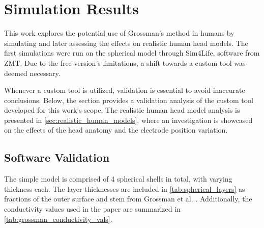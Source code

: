 \pagebreak
\chapter{Simulation Results}



This work explores the potential use of Grossman's \cite{Grossman2017} method in humans by simulating and later assessing the effects on realistic human head models. The first simulations were run on the spherical model through Sim4Life, software from \gls{ZMT}. Due to the free version's limitations, a shift towards a custom tool was deemed necessary.

Whenever a custom tool is utilized, validation is essential to avoid inaccurate conclusions. Below, the  section provides a validation analysis of the custom tool developed for this work's scope. The realistic human head model analysis is presented in \autoref{sec:realistic_human_models}, where an investigation is showcased on the effects of the head anatomy and the electrode position variation.

\section{Software Validation}
\label{sec:soft_validation}

The simple model is comprised of 4 spherical shells in total, with varying thickness each. The layer thicknesses are included in \autoref{tab:spherical_layers} as fractions of the outer surface and stem from Grossman et al. \cite[Figure S2, J, and K]{Grossman2017}. Additionally, the conductivity values used in the paper are summarized in \autoref{tab:grossman_conductivity_vals}.

